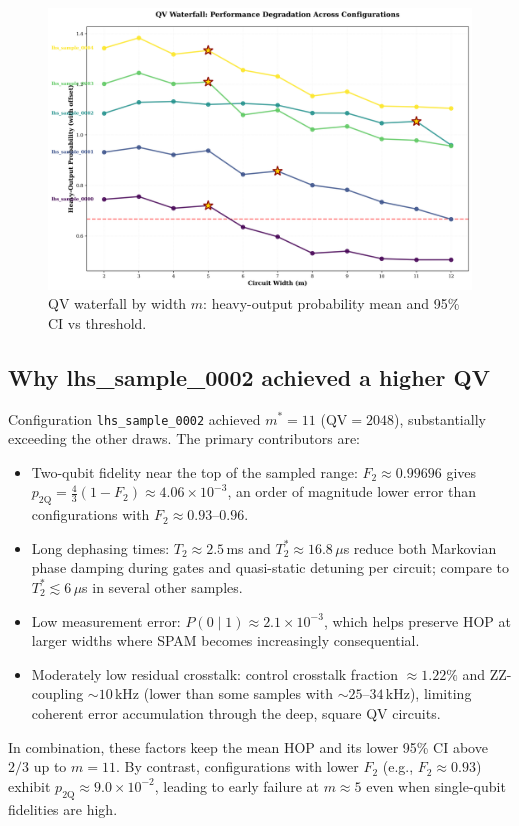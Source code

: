 \begin{figure}[!htb]
  \centering
  \includegraphics[width=0.85\linewidth]{plots/overview/qv_waterfall.png}
  \caption{QV waterfall by width $m$: heavy-output probability mean and 95\% CI vs threshold.}
  \label{fig:qv-waterfall}
\end{figure}

\subsection{Why lhs\_sample\_0002 achieved a higher QV}
Configuration \texttt{lhs\_sample\_0002} achieved $m^*=11$ ($\mathrm{QV}=2048$), substantially exceeding the other draws. The primary contributors are:
\begin{itemize}
  \item Two-qubit fidelity near the top of the sampled range: $F_2\approx0.99696$ gives $p_{2\mathrm{Q}}=\tfrac{4}{3}(1-F_2)\approx4.06\times10^{-3}$, an order of magnitude lower error than configurations with $F_2\approx0.93$--$0.96$.
  \item Long dephasing times: $T_2\approx2.5$\,ms and $T_2^*\approx16.8$\,$\mu$s reduce both Markovian phase damping during gates and quasi-static detuning per circuit; compare to $T_2^*\lesssim 6$\,$\mu$s in several other samples.
  \item Low measurement error: $P(0\mid1)\approx2.1\times10^{-3}$, which helps preserve HOP at larger widths where SPAM becomes increasingly consequential.
  \item Moderately low residual crosstalk: control crosstalk fraction $\approx1.22\%$ and ZZ-coupling $\sim10$\,kHz (lower than some samples with $\sim25$--$34$\,kHz), limiting coherent error accumulation through the deep, square QV circuits.
\end{itemize}
In combination, these factors keep the mean HOP and its lower 95\% CI above $2/3$ up to $m=11$. By contrast, configurations with lower $F_2$ (e.g., $F_2\approx0.93$) exhibit $p_{2\mathrm{Q}}\approx9.0\times10^{-2}$, leading to early failure at $m\approx5$ even when single-qubit fidelities are high.

